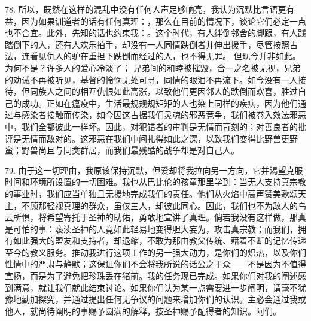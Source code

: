 78. 所以，既然在这样的混乱中没有任何人声足够响亮，我认为沉默比言语更有益，因为如果训道者的话有任何真理：，那么在目前的情况下，谈论它们必定一点也不合宜。此外，先知的话也约束我：。这个时代，有人绊倒邻舍的脚跟，有人践踏倒下的人，还有人欢乐拍手，却没有一人同情跌倒者并伸出援手，尽管按照古法，连看见仇人的驴在重担下跌倒而经过的人，也不得无罪。 但现今并非如此。为何不是？许多人的爱心冷淡了； 兄弟间的和睦被摧毁，合一之名被无视，兄弟的劝诫不再被听见，基督的怜悯无处可寻，同情的眼泪不再流下。如今没有一人接待，但同族人之间的相互仇恨如此高涨，以致他们更因邻人的跌倒而欢喜，胜过自己的成功。正如在瘟疫中，生活最规规规矩矩的人也染上同样的疾病，因为他们通过与感染者接触而传染，如今因这占据我们灵魂的邪恶竞争，我们被卷入效法邪恶中，我们全都彼此一样坏。因此，对犯错者的审判是无情而苛刻的；对善良者的批评是无情而敌对的。这邪恶在我们中间扎得如此之深，以致我们变得比野兽更野蛮；野兽尚且与同类群居，而我们最残酷的战争却是对自己人。\par

79. 由于这一切理由，我原该保持沉默，但爱却将我拉向另一方向，它并渴望克服时间和环境所设置的一切困难。我也从巴比伦的孩童那里学到：当无人支持真宗教的事业时，我们应当单独且无援地完成我们的责任。他们从火焰中高声赞美歌颂天主，不顾那轻视真理的群众，虽仅三人，却彼此同心。因此，我们也不为敌人的乌云所惧，将希望寄托于圣神的助佑，勇敢地宣讲了真理。倘若我没有这样做，那真是可怕的事：亵渎圣神的人竟如此轻易地变得胆大妄为，攻击真宗教；而我们，拥有如此强大的盟友和支持者，却退缩，不敢为那由教父传统、藉着不断的记忆传递至今的教义服务。推动我进行这项工作的另一强大动力，是你们的炽热，以及你们性情中的严肃与静默；这保证你们不会将我所说的话公之于众——不是因为不值得宣扬，而是为了避免把珍珠丢在猪前。我的任务现已完成。如果你们对我的阐述感到满意，就让我们就此结束讨论。如果你们认为某一点需要进一步阐明，请毫不犹豫地勤加探究，并通过提出任何无争议的问题来增加你们的认识。主必会通过我或他人，就尚待阐明的事赐予圆满的解释，按圣神赐予配得者的知识。阿们。\par

